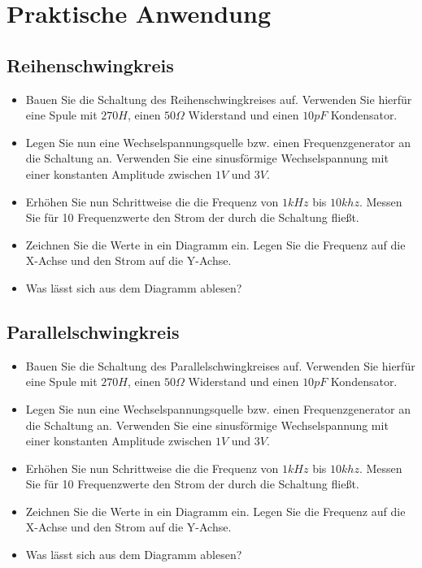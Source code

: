 \section{Praktische Anwendung}

\subsection*{Reihenschwingkreis}

\begin{itemize}
\itemsep1pt\parskip0pt
\item Bauen Sie die Schaltung des Reihenschwingkreises auf. Verwenden Sie hierfür eine Spule mit $270H$, einen $50\Omega$ Widerstand und einen $10pF$ Kondensator. 
\item Legen Sie nun eine Wechselspannungsquelle bzw. einen Frequenzgenerator an die Schaltung an. Verwenden Sie eine sinusförmige Wechselspannung mit einer konstanten Amplitude zwischen $1V$ und $3V$.
\item Erhöhen Sie nun Schrittweise die die Frequenz von $1kHz$ bis $10khz$. Messen Sie für 10 Frequenzwerte den Strom der durch die Schaltung fließt.
\item Zeichnen Sie die Werte in ein Diagramm ein. Legen Sie die Frequenz auf die X-Achse und den Strom auf die Y-Achse.
\item Was lässt sich aus dem Diagramm ablesen?
\end{itemize}


\subsection*{Parallelschwingkreis}

\begin{itemize}
\itemsep1pt\parskip0pt
\item Bauen Sie die Schaltung des Parallelschwingkreises auf. Verwenden Sie hierfür eine Spule mit $270H$, einen $50\Omega$ Widerstand und einen $10pF$ Kondensator. 
\item Legen Sie nun eine Wechselspannungsquelle bzw. einen Frequenzgenerator an die Schaltung an. Verwenden Sie eine sinusförmige Wechselspannung mit einer konstanten Amplitude zwischen $1V$ und $3V$.
\item Erhöhen Sie nun Schrittweise die die Frequenz von $1kHz$ bis $10khz$. Messen Sie für 10 Frequenzwerte den Strom der durch die Schaltung fließt.
\item Zeichnen Sie die Werte in ein Diagramm ein. Legen Sie die Frequenz auf die X-Achse und den Strom auf die Y-Achse.
\item Was lässt sich aus dem Diagramm ablesen?
\end{itemize}

